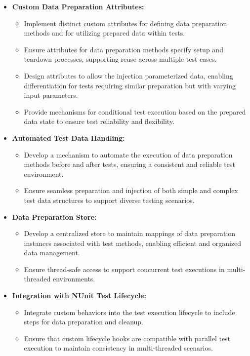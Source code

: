 \begin{itemize}
	\item \textbf{Custom Data Preparation Attributes:}
	      \begin{itemize}
		      \item Implement distinct custom attributes for defining data preparation methods and for utilizing prepared data within tests.
		      \item Ensure attributes for data preparation methods specify setup and teardown processes, supporting reuse across multiple test cases.
		      \item Design attributes to allow the injection parameterized data, enabling differentiation for tests requiring similar preparation but with varying input parameters.
		      \item Provide mechanisms for conditional test execution based on the prepared data state to ensure test reliability and flexibility.
	      \end{itemize}

	\item \textbf{Automated Test Data Handling:}
	      \begin{itemize}
		      \item Develop a mechanism to automate the execution of data preparation methods before and after tests, ensuring a consistent and reliable test environment.
		      \item Ensure seamless preparation and injection of both simple and complex test data structures to support diverse testing scenarios.
	      \end{itemize}

	\item \textbf{Data Preparation Store:}
	      \begin{itemize}
		      \item Develop a centralized store to maintain mappings of data preparation instances associated with test methods, enabling efficient and organized data management.
		      \item Ensure thread-safe access to support concurrent test executions in multi-threaded environments.
	      \end{itemize}

	\item \textbf{Integration with NUnit Test Lifecycle:}
	      \begin{itemize}
		      \item Integrate custom behaviors into the test execution lifecycle to include steps for data preparation and cleanup.
		      \item Ensure that custom lifecycle hooks are compatible with parallel test execution to maintain consistency in multi-threaded scenarios.
	      \end{itemize}


\end{itemize}
